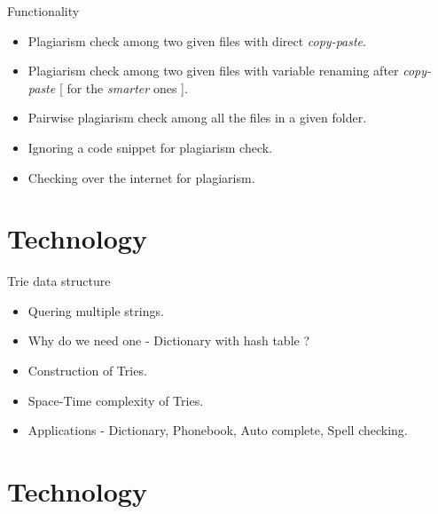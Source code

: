 \documentclass[color=usenames,dvipsnames]{beamer}
\begin{document}
\begin{frame}{Functionality}

\begin{itemize}

\setlength{\itemsep}{25pt}
  
\item Plagiarism check among two given files with direct \emph{copy-paste}. 

\item Plagiarism check among two given files with variable renaming after \emph{copy-paste} [ for the \emph{smarter} ones ]. 
  
\item Pairwise plagiarism check among all the files in a given folder. 

\item Ignoring a code snippet for plagiarism check.

\item Checking over the internet for plagiarism.

\end{itemize}
\end{frame}

\section{Technology}

\begin{frame}{Trie data structure}

\begin{itemize}
  \setlength{\itemsep}{25pt}
  
  \item Quering multiple strings.
  
  \item Why do we need one - Dictionary with hash table ?
  
  \item Construction of Tries.
  
  \item Space-Time complexity of Tries.
  
  \item Applications - Dictionary, Phonebook, Auto complete, Spell checking.

  
\end{itemize}

\end{frame}

\section{Technology}
\end{document}
